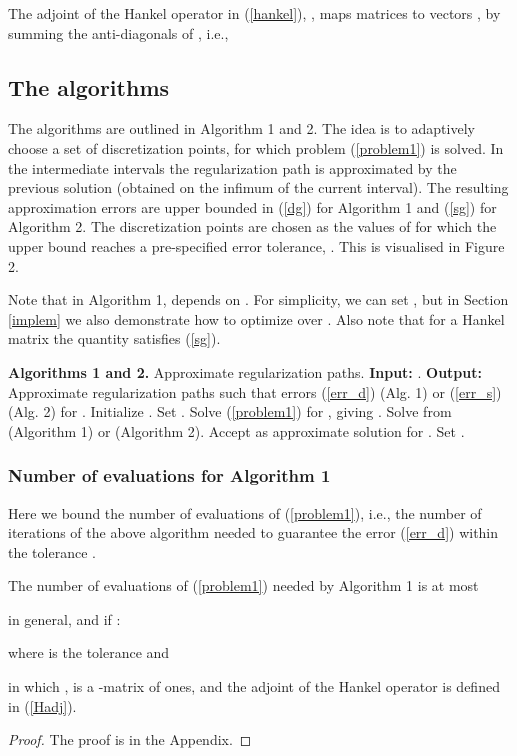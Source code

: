 \documentclass{article}
\begin{document}
The adjoint of the Hankel operator in (\ref{hankel}), , maps matrices  to vectors , by summing the anti-diagonals of , i.e.,


\subsection{The algorithms}

The algorithms are outlined in Algorithm 1 and 2. The idea is to adaptively choose a set of discretization points, for which problem (\ref{problem1}) is solved. In the intermediate intervals the regularization path is approximated by the previous solution (obtained on the infimum of the current interval). The resulting approximation errors are upper bounded in (\ref{dg}) for Algorithm 1 and (\ref{sg}) for Algorithm 2. The discretization points are chosen as the values of  for which the upper bound reaches a pre-specified error tolerance, . This is visualised in Figure 2.

Note that in Algorithm 1,  depends on . For simplicity, we can set , but in Section \ref{implem} we also demonstrate how to optimize  over . Also note that for a Hankel matrix the quantity  satisfies (\ref{sg}).

\begin{algorithm}                    \begin{algorithmic}                    \State \textbf{Algorithms 1 and 2.} Approximate regularization paths.
	\State \textbf{Input: } .
	\State \textbf{Output: } Approximate regularization paths such that errors (\ref{err_d})  (Alg. 1) or (\ref{err_s})  (Alg. 2) for .
\State Initialize . Set .
    \While{}
    	\State Solve (\ref{problem1}) for , giving .
        \State Solve  from  (Algorithm 1) or  (Algorithm 2).
        \State Accept  as approximate solution for .
        \State Set .
    \EndWhile
\end{algorithmic}
\end{algorithm}

\subsubsection{Number of evaluations for Algorithm 1} \label{cfrp_A}

Here we bound the number of evaluations of (\ref{problem1}), i.e., the number of iterations of the above algorithm needed to guarantee the error (\ref{err_d}) within the tolerance .
\begin{theorem} \label{Malg1}
The number of evaluations of (\ref{problem1}) needed by Algorithm 1 is at most

in general, and if :

where  is the tolerance and

in which ,  is a -matrix of ones, and the adjoint of the Hankel operator is defined in (\ref{Hadj}).
\end{theorem}
\begin{proof} The proof is in the Appendix.
\end{proof}
\end{document}
